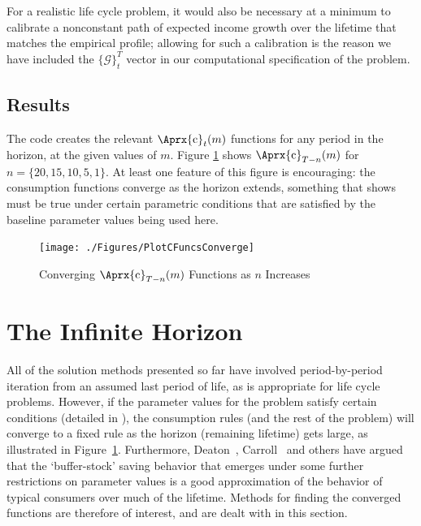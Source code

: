 \documentclass[titlepage, headings=optiontotocandhead]{econtex}
\newcommand{\MoM}{\ifthenelse{\boolean{MoMVersion}}}
\begin{document}
For a realistic life cycle problem, it would also be necessary at a
minimum to calibrate a nonconstant path of expected income growth over the
lifetime that matches the empirical profile; allowing for such
a calibration is the reason we have included the $\{\mathcal{G}\}_{t}^{T}$
vector in our computational specification of the problem.

\hypertarget{results}{}
\subsection{Results}

The code creates the relevant $\Aprx{\mathrm{c}}_{t}(m)$ functions for any period in the horizon, at the given values of $m$.  Figure \ref{fig:PlotCFuncsConverge} shows $\Aprx{\mathrm{c}}_{T-n}(m)$ for $n=\{20,15,10,5,1\}$.  At least one feature of this figure is encouraging: the consumption functions converge as the horizon extends, something that \cite{BufferStockTheory} shows must be true under certain parametric conditions that are satisfied by the baseline parameter values being used here.

\hypertarget{PlotCFuncsConverge}{}
\begin{figure}
  \texttt{[image: ./Figures/PlotCFuncsConverge]}
  \caption{Converging $\Aprx{\mathrm{c}}_{T-n}(m)$ Functions as $n$ Increases}
  \label{fig:PlotCFuncsConverge}
\end{figure}



\hypertarget{the-infinite-horizon}{}
\section{The Infinite Horizon}\label{sec:the-infinite-horizon}

All of the solution methods presented so far have involved period-by-period iteration from an assumed last period of life, as is appropriate for life cycle problems.  However, if the parameter values for the problem satisfy certain conditions (detailed in \cite{BufferStockTheory}), the consumption rules (and the rest of the problem) will converge to a fixed rule as the horizon (remaining lifetime) gets large, as illustrated in Figure~\ref{fig:PlotCFuncsConverge}.  Furthermore, Deaton~\citeyearpar{deatonLiqConstr}, Carroll~\citeyearpar{carroll:brookings,carrollBSLCPIH} and others have argued that the `buffer-stock' saving behavior that emerges under some further restrictions on parameter values is a good approximation of the behavior of typical consumers over much of the lifetime.  Methods for finding the converged functions are therefore of interest, and are dealt with in this section.
\end{document}
